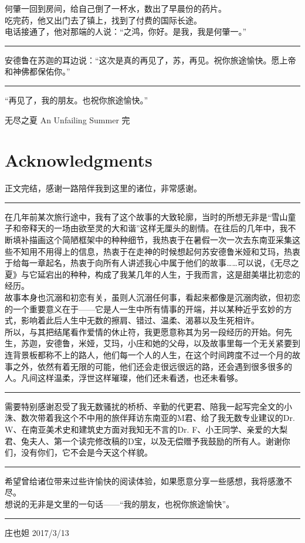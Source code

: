 \documentclass[oneside,11pt]{memoir} %
\begin{document}
\begin{CJK}{UTF8}{gbsn}
    何肇一回到房间，给自己倒了一杯水，数出了早晨份的药片。\\\indent
    吃完药，他又出门去了镇上，找到了付费的国际长途。\\\indent
    电话接通了，他对那端的人说：“之鸿，你好。是我，我是何肇一。”\\\indent

\rule{-3pt}{30pt}
     安德鲁在苏迦的耳边说：“这次是真的再见了，苏，再见。祝你旅途愉快。愿上帝和神佛都保佑你。”\\\indent
\rule{-3pt}{30pt}

     “再见了，我的朋友。也祝你旅途愉快。”\\\indent

无尽之夏    An Unfailing Summer    完

\newpage
\chapter*{Acknowledgments}
 正文完结，感谢一路陪伴我到这里的诸位，非常感谢。\\\indent
\rule{-3pt}{30pt}    
    在几年前某次旅行途中，我有了这个故事的大致轮廓，当时的所想无非是“雪山童子和帝释天的一场由欲至灵的大和谐”这样无厘头的剧情。在往后的几年中，我不断填补描画这个简陋框架中的种种细节，我热衷于在暑假一次一次去东南亚采集这些不知用不用得上的信息，热衷于在走神的时候想起何苏安德鲁米娅和艾玛，热衷于给每一章起名，热衷于向所有人讲述我心中属于他们的故事……可以说，《无尽之夏》与它延宕出的种种，构成了我某几年的人生，于我而言，这是甜美堪比初恋的经历。\\\indent
    故事本身也沉溺和初恋有关，虽则人沉溺任何事，看起来都像是沉溺肉欲，但初恋的一个重要意义在于——它是人一生中所有情事的开端，并以某种近乎玄妙的方式，影响着此后人生中无数的擦肩、错过、温柔、渴慕以及生死相许。\\\indent
    所以，与其把结尾看作爱情的休止符，我更愿意称其为另一段经历的开始。何先生，苏迦，安德鲁，米娅，艾玛，小庄和她的父母，以及故事里每一个无关紧要到连背景板都称不上的路人，他们每一个人的人生，在这个时间跨度不过一个月的故事之外，依然有着无限的可能，他们还会走很远很远的路，还会遇到很多很多的人。凡间这样温柔，浮世这样璀璨，他们还未看透，也还未看够。\\\indent
 \rule{-3pt}{30pt}  
  需要特别感谢忍受了我无数骚扰的桥桥、辛勤的代更君、陪我一起写完全文的小洙、数次带着我这个不中用的旅伴拜访东南亚的M君、给了我无数专业建议的Dr. W、在南亚美术史和建筑史方面对我知无不言的Dr. F、小王同学、亲爱的大梨君、兔夫人、第一个读完修改稿的D宝，以及无偿赠予我鼓励的所有人。谢谢你们，没有你们，它不会是今天这个样貌。\\\indent
\rule{-3pt}{30pt}
    希望曾给诸位带来过些许愉快的阅读体验，如果愿意分享一些感想，我将感激不尽。\\\indent
    想说的无非是文里的一句话——“我的朋友，也祝你旅途愉快”。\\\indent
\rule{-3pt}{30pt}
庄也妲
2017/3/13


\end{CJK}
\end{document}
